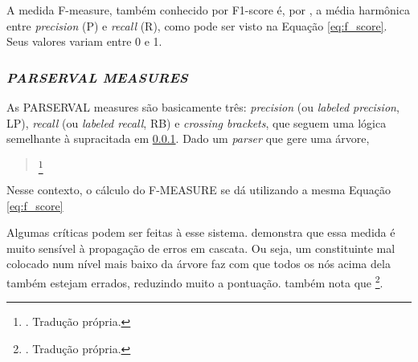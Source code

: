 \begin{center}
    
\end{center}
A medida F-measure, também conhecido por F1-score  é, por , a média harmônica entre \textit{precision} (P) e \textit{recall} (R), como pode ser visto na Equação \ref{eq:f_score}. Seus valores variam entre 0 e 1. 
\begin{center}
    
\end{center}


\subsubsection{\textit{PARSERVAL MEASURES}}
\label{subsec:parseval}
As PARSERVAL measures são basicamente três: \textit{precision} (ou \textit{labeled precision}, LP), \textit{recall} (ou \textit{labeled recall}, RB) e \textit{crossing brackets}, que seguem uma lógica semelhante à supracitada em \ref{subsec:parseval}. Dado um \textit{parser} que gere uma árvore, 
\begin{quote}
    \footnote{. Tradução própria.}
\end{quote}
\begin{center}
    
\end{center}
Nesse contexto, o cálculo do F-MEASURE se dá utilizando a mesma Equação \ref{eq:f_score}

Algumas críticas podem ser feitas à esse sistema.  demonstra que essa medida é muito sensível à propagação de erros em cascata. Ou seja, um constituinte mal colocado num nível mais baixo da árvore faz com que todos os nós acima dela também estejam errados, reduzindo muito a pontuação.  também nota que 
\footnote{. Tradução própria.}.

